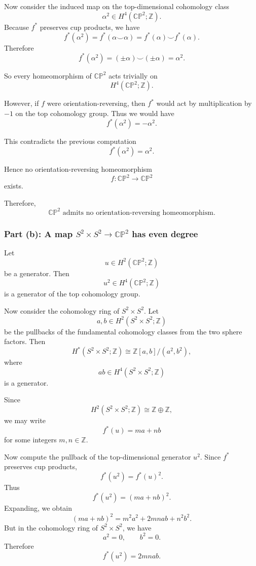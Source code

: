 \documentclass[12pt,a4paper]{article}
\theoremstyle{notespace}
\begin{document}
Now consider the induced map on the top-dimensional cohomology class
\[
\alpha^{2}\in H^{4}(\mathbb{CP}^{2};\mathbb{Z}).
\]
Because \(f^{*}\) preserves cup products, we have
\[
f^{*}(\alpha^{2})
=
f^{*}(\alpha\smile \alpha)
=
f^{*}(\alpha)\smile f^{*}(\alpha).
\]
Therefore
\[
f^{*}(\alpha^{2})
=
(\pm \alpha)\smile(\pm \alpha)
=
\alpha^{2}.
\]

So every homeomorphism of \(\mathbb{CP}^{2}\) acts trivially on
\[
H^{4}(\mathbb{CP}^{2};\mathbb{Z}).
\]

However, if \(f\) were orientation-reversing, then \(f^{*}\) would act by multiplication by \(-1\) on the top cohomology group. Thus we would have
\[
f^{*}(\alpha^{2})=-\alpha^{2}.
\]

This contradicts the previous computation
\[
f^{*}(\alpha^{2})=\alpha^{2}.
\]

Hence no orientation-reversing homeomorphism
\[
f:\mathbb{CP}^{2}\longrightarrow \mathbb{CP}^{2}
\]
exists.

Therefore,
\[
\boxed{\mathbb{CP}^{2}\text{ admits no orientation-reversing homeomorphism.}}
\]

\subsubsection*{Part (b): A map \texorpdfstring{$S^{2}\times S^{2}\to \mathbb{CP}^{2}$}{S2 x S2 to CP2} has even degree}

Let
\[
u\in H^{2}(\mathbb{CP}^{2};\mathbb{Z})
\]
be a generator. Then
\[
u^{2}\in H^{4}(\mathbb{CP}^{2};\mathbb{Z})
\]
is a generator of the top cohomology group.

Now consider the cohomology ring of \(S^{2}\times S^{2}\). Let
\[
a,b\in H^{2}(S^{2}\times S^{2};\mathbb{Z})
\]
be the pullbacks of the fundamental cohomology classes from the two sphere factors. Then
\[
H^{*}(S^{2}\times S^{2};\mathbb{Z})
\cong
\mathbb{Z}[a,b]/(a^{2},b^{2}),
\]
where
\[
ab\in H^{4}(S^{2}\times S^{2};\mathbb{Z})
\]
is a generator.

Since
\[
H^{2}(S^{2}\times S^{2};\mathbb{Z})
\cong
\mathbb{Z}\oplus \mathbb{Z},
\]
we may write
\[
f^{*}(u)=ma+nb
\]
for some integers \(m,n\in\mathbb{Z}\).

Now compute the pullback of the top-dimensional generator \(u^{2}\). Since \(f^{*}\) preserves cup products,
\[
f^{*}(u^{2})
=
f^{*}(u)^2.
\]
Thus
\[
f^{*}(u^{2})
=
(ma+nb)^2.
\]
Expanding, we obtain
\[
(ma+nb)^2
=
m^{2}a^{2}+2mnab+n^{2}b^{2}.
\]
But in the cohomology ring of \(S^{2}\times S^{2}\), we have
\[
a^{2}=0,
\qquad
b^{2}=0.
\]
Therefore
\[
f^{*}(u^{2})=2mnab.
\]
\end{document}
